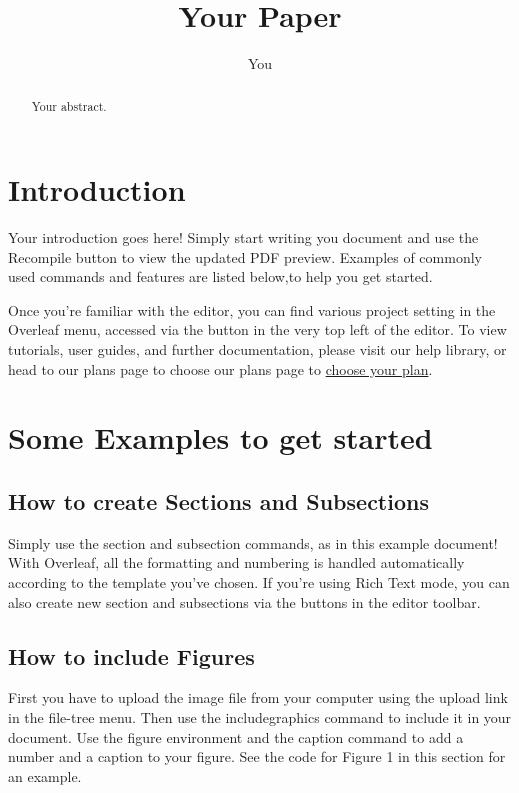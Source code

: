 \documentclass[10pt,english]{article}
\title{Your Paper}
\author{You}
\begin{document}
	
	\maketitle	
	\begin{abstract}
		Your abstract.
	\end{abstract}
	\section{Introduction}
	
	Your introduction goes here! Simply start writing you
	document and use the Recompile button to view the updated PDF preview. Examples of commonly used commands and features are listed below,to help you get started.
	
	Once you’re familiar with the editor, you can find various project setting in the Overleaf menu,
	accessed via the button in the very top left of the editor. To view tutorials, user guides, and further
	documentation, please visit our help library, or head to our plans page to choose our plans page to
	\href{https://www..overleaf.com/user/subscription/plans}{choose your plan}.
	\section{Some Examples to get started}
	\subsection{How to create Sections and Subsections}
	Simply use the section and subsection commands, as in this example document! With Overleaf, all
	the formatting and numbering is handled automatically according to the template you’ve chosen. If
	you’re using Rich Text mode, you can also create new section and subsections via the buttons in the
	editor toolbar.
	\subsection{How to include Figures}
	First you have to upload the image file from your computer using the upload link in the file-tree menu.
	Then use the includegraphics command to include it in your document. Use the figure environment
	and the caption command to add a number and a caption to your figure. See the code for Figure 1 in
	this section for an example.
	
\end{document}
